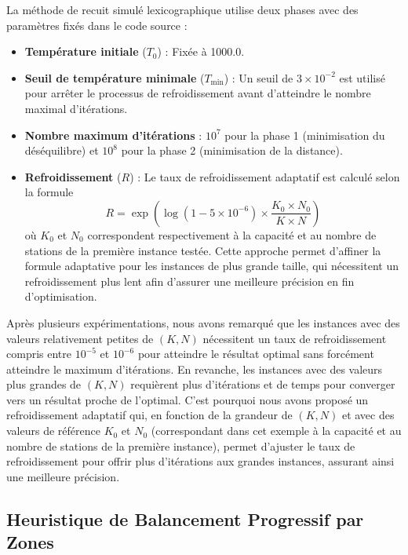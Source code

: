 \documentclass{article}
\begin{document}
La méthode de recuit simulé lexicographique utilise deux phases avec des paramètres fixés dans le code source :

\begin{itemize}
  \item \textbf{Température initiale} ($T_0$) : Fixée à 1000.0.

  \item \textbf{Seuil de température minimale} ($T_{\min}$) : Un seuil de $3 \times 10^{-2}$ est utilisé pour arrêter le processus de refroidissement avant d'atteindre le nombre maximal d'itérations.

  \item \textbf{Nombre maximum d'itérations} : $10^7$ pour la phase 1 (minimisation du déséquilibre) et $10^8$ pour la phase 2 (minimisation de la distance).

  \item \textbf{Refroidissement} ($R$) : Le taux de refroidissement adaptatif est calculé selon la formule
  \[
  R = \exp\left(\log(1 - 5 \times 10^{-6}) \times \frac{K_0 \times N_0}{K \times N}\right)
  \]
  où $K_0$ et $N_0$ correspondent respectivement à la capacité et au nombre de stations de la première instance testée. Cette approche permet d'affiner la formule adaptative pour les instances de plus grande taille, qui nécessitent un refroidissement plus lent afin d'assurer une meilleure précision en fin d'optimisation.
\end{itemize}

Après plusieurs expérimentations, nous avons remarqué que les instances avec des valeurs relativement petites de $(K, N)$ nécessitent un taux de refroidissement compris entre $10^{-5}$ et $10^{-6}$ pour atteindre le résultat optimal sans forcément atteindre le maximum d'itérations. En revanche, les instances avec des valeurs plus grandes de $(K, N)$ requièrent plus d'itérations et de temps pour converger vers un résultat proche de l'optimal. C'est pourquoi nous avons proposé un refroidissement adaptatif qui, en fonction de la grandeur de $(K, N)$ et avec des valeurs de référence $K_0$ et $N_0$ (correspondant dans cet exemple à la capacité et au nombre de stations de la première instance), permet d'ajuster le taux de refroidissement pour offrir plus d'itérations aux grandes instances, assurant ainsi une meilleure précision.



\subsection{Heuristique de Balancement Progressif par Zones}
\end{document}

